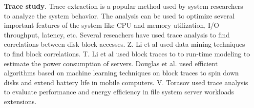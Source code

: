 \textbf{Trace study}. Trace extraction is a popular method used by
system researchers to analyze the system behavior. The analysis can be
used to optimize several important features of the system like CPU and
memory utilization, I/O throughput, latency, etc. Several reseachers
have used trace analysis to find correlations between disk block
accesses. Z. Li et al \cite{Li04c-miner} used data mining techniques
to find block correlations. T. Li et al \cite{Li_model} used block
traces to to run-time modeling to estimate the power consumption of
servers. Douglas et al. \cite{Douglis_95} used efficient algorithms
based on machine learning techniques on block traces to spin down
disks and extend battery life in mobile computers. V. Torasov
\cite{fast12t2m} used trace analysis to evaluate performance and
energy efficiency in file system server workloads extensions.


